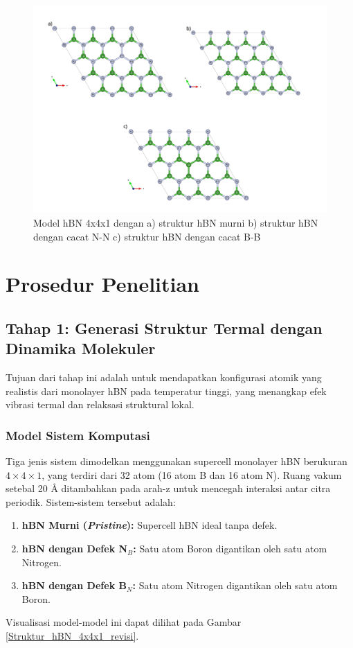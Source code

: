 \begin{figure}
    \centering
    \includegraphics[width=0.8\linewidth]{gambar_hasil/structures_all.png}
    \caption{Model hBN 4x4x1 dengan a) struktur hBN murni b) struktur hBN dengan cacat N-N c) struktur hBN dengan cacat B-B}
    \label{Struktur hBN 4x4x1}
\end{figure}

\section{Prosedur Penelitian}

\subsection{Tahap 1: Generasi Struktur Termal dengan Dinamika Molekuler}
Tujuan dari tahap ini adalah untuk mendapatkan konfigurasi atomik yang realistis dari monolayer hBN pada temperatur tinggi, yang menangkap efek vibrasi termal dan relaksasi struktural lokal.

\subsubsection{Model Sistem Komputasi}
Tiga jenis sistem dimodelkan menggunakan supercell monolayer hBN berukuran $4 \times 4 \times 1$, yang terdiri dari 32 atom (16 atom B dan 16 atom N). Ruang vakum setebal 20 Å ditambahkan pada arah-z untuk mencegah interaksi antar citra periodik. Sistem-sistem tersebut adalah:
\begin{enumerate}
    \item \textbf{hBN Murni (\textit{Pristine}):} Supercell hBN ideal tanpa defek.
    \item \textbf{hBN dengan Defek N$_B$:} Satu atom Boron digantikan oleh satu atom Nitrogen.
    \item \textbf{hBN dengan Defek B$_N$:} Satu atom Nitrogen digantikan oleh satu atom Boron.
\end{enumerate}
Visualisasi model-model ini dapat dilihat pada Gambar \ref{Struktur_hBN_4x4x1_revisi}.

